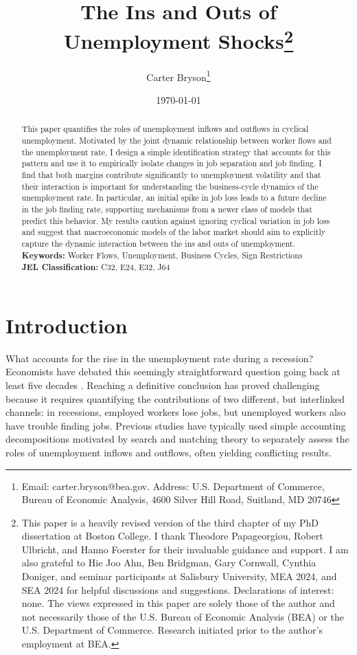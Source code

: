 \documentclass[12pt]{article}
\title{The Ins and Outs of Unemployment Shocks\thanks{This paper is a heavily revised version of the third chapter of my PhD dissertation at Boston College. I thank Theodore Papageorgiou, Robert Ulbricht, and Hanno Foerster for their invaluable guidance and support. I am also grateful to Hie Joo Ahn, Ben Bridgman, Gary Cornwall, Cynthia Doniger, and seminar participants at Salisbury University, MEA 2024, and SEA 2024 for helpful discussions and suggestions. Declarations of interest: none. The views expressed in this paper are solely those of the author and not necessarily those of the U.S. Bureau of Economic Analysis (BEA) or the U.S. Department of Commerce. Research initiated prior to the author's employment at BEA.}}
\author{Carter Bryson\thanks{Email: carter.bryson@bea.gov. Address: U.S. Department of Commerce, Bureau of Economic Analysis, 4600 Silver Hill Road, Suitland, MD 20746}}
\date{\today}
\begin{document}
\maketitle
\thispagestyle{empty}

\begin{abstract}
This paper quantifies the roles of unemployment inflows and outflows in cyclical unemployment. Motivated by the joint dynamic relationship between worker flows and the unemployment rate, I design a simple identification strategy that accounts for this pattern and use it to empirically isolate changes in job separation and job finding. I find that both margins contribute significantly to unemployment volatility and that their interaction is important for understanding the business-cycle dynamics of the unemployment rate. In particular, an initial spike in job loss leads to a future decline in the job finding rate, supporting mechanisms from a newer class of models that predict this behavior. My results caution against ignoring cyclical variation in job loss and suggest that macroeconomic models of the labor market should aim to explicitly capture the dynamic interaction between the ins and outs of unemployment.
\vfill\noindent
\textbf{Keywords:} Worker Flows, Unemployment, Business Cycles, Sign Restrictions \\
\textbf{JEL Classification:} C32, E24, E32, J64
\end{abstract}

\clearpage
{} 

\section{Introduction}\label{sec:intro}

What accounts for the rise in the unemployment rate during a recession? Economists have debated this seemingly straightforward question going back at least five decades \citep{Darby:1986aa, Blanchard:1990aa, Elsby:2009aa, Shimer:2012aa, Mercan:2024aa}. Reaching a definitive conclusion has proved challenging because it requires quantifying the contributions of two different, but interlinked channels: in recessions, employed workers lose jobs, but unemployed workers also have trouble finding jobs. Previous studies have typically used simple accounting decompositions motivated by search and matching theory to separately assess the roles of unemployment inflows and outflows, often yielding conflicting results.
\end{document}
